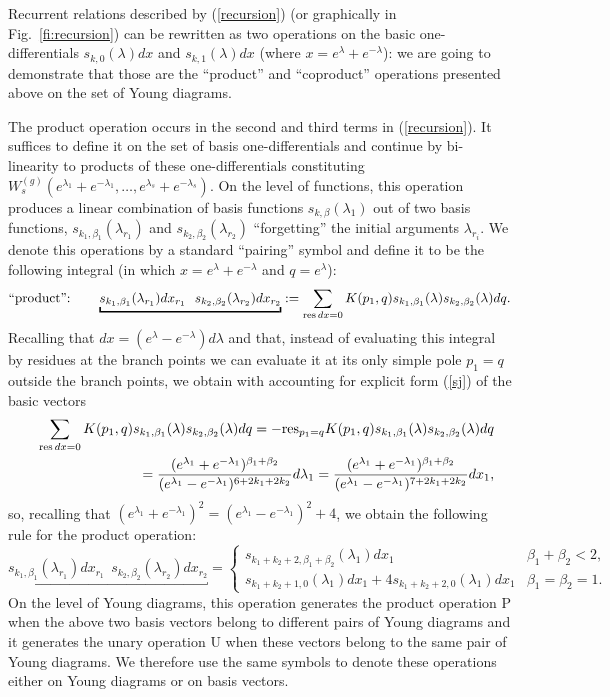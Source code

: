 \documentclass[11pt]{article}
\def\be{\begin{equation}}
\def\ee{\end{equation}}
\def\bea{\begin{eqnarray}}
\def\eea{\end{eqnarray}}
\def\res{{{\rm res}}}
\def\bea{\begin{eqnarray}}
\def\eea{\end{eqnarray}}
\theoremstyle{plain}
\theoremstyle{definition}
\def\bea{\begin{eqnarray}}
\def\eea{\end{eqnarray}}
\begin{document}
Recurrent relations described by (\ref{recursion}) (or graphically in Fig.~\ref{fi:recursion}) can be rewritten as two operations on the
basic one-differentials $s_{k,0}(\lambda)dx$ and $s_{k,1}(\lambda)dx$ (where $x=e^\lambda+e^{-\lambda}$): we are going to demonstrate that
those are the ``product'' and ``coproduct'' operations presented above on the set of Young diagrams.

The product operation occurs in the second and
third terms in  (\ref{recursion}). It suffices to define it on the set of basis one-differentials and continue by bi-linearity to products of these one-differentials constituting
$W^{(g)}_s(e^{\lambda_1}+e^{-\lambda_1},\dots, e^{\lambda_s}+e^{-\lambda_s})$. On the level of functions,
this operation produces a linear combination of basis functions $s_{k,\beta}(\lambda_1)$ out of two basis functions,
$s_{k_1,\beta_1}(\lambda_{r_1})$ and $s_{k_2,\beta_2}(\lambda_{r_2})$ ``forgetting'' the initial arguments $\lambda_{r_i}$. We denote
this operations by a standard ``pairing'' symbol and define it to be the following integral (in which $x=e^\lambda+e^{-\lambda}$ and $q=e^\lambda$):
\be
\hbox{``product'':}\quad \quad \underbracket {s_{k_1,\beta_1}(\lambda_{r_1})dx_{r_1}\ \  s_{k_2,\beta_2}(\lambda_{r_2})dx_{r_2}}:=
\sum_{\mathrm{res\,}dx=0} K(p_1,q)s_{k_1,\beta_1}(\lambda)s_{k_2,\beta_2}(\lambda)dq.
\label{contr1}
\ee
Recalling that $dx=(e^{\lambda}-e^{-\lambda})d\lambda$ and that, instead of evaluating this integral by residues at the branch points we
can evaluate it at its only simple pole $p_1=q$ outside the branch points, we obtain with accounting for explicit form (\ref{sj}) of the basic vectors
\bea
&{}&
\sum_{\mathrm{res\,}dx=0} K(p_1,q)s_{k_1,\beta_1}(\lambda)s_{k_2,\beta_2}(\lambda)dq=-\res_{p_1=q}K(p_1,q)s_{k_1,\beta_1}(\lambda)s_{k_2,\beta_2}(\lambda)dq\nonumber\\
&{}&\quad=\frac{(e^{\lambda_1}+e^{-\lambda_1})^{\beta_1+\beta_2}}{(e^{\lambda_1}-e^{-\lambda_1})^{6+2k_1+2k_2}}d\lambda_1
=\frac{(e^{\lambda_1}+e^{-\lambda_1})^{\beta_1+\beta_2}}{(e^{\lambda_1}-e^{-\lambda_1})^{7+2k_1+2k_2}}dx_1,\nonumber
\eea
so, recalling that $(e^{\lambda_1}+e^{-\lambda_1})^2=(e^{\lambda_1}-e^{-\lambda_1})^2+4$, we obtain the following rule for the product operation:
\be
\underbracket {s_{k_1,\beta_1}(\lambda_{r_1})dx_{r_1}\ \  s_{k_2,\beta_2}(\lambda_{r_2})dx_{r_2}}=
\left\{\begin{array}{ll} s_{k_1+k_2+2,\beta_1+\beta_2}(\lambda_1)dx_1& \beta_1+\beta_2< 2,\\
s_{k_1+k_2+1,0}(\lambda_1)dx_1+4s_{k_1+k_2+2,0}(\lambda_1)dx_1& \beta_1=\beta_2=1.
\end{array}
\right.
\label{contr2}
\ee
On the level of Young diagrams, this operation generates the product operation P when the above two basis vectors belong to different pairs of Young diagrams and it generates the unary operation U when these vectors belong to the same pair of Young diagrams. We therefore use the same symbols to denote these operations either on Young diagrams or on basis vectors.
\end{document}
